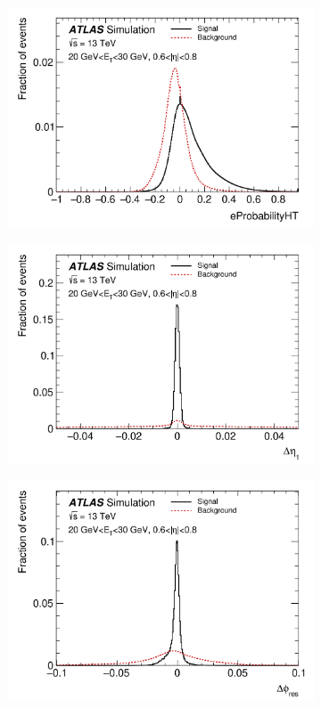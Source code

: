 \begin{figure}[hp]
\begin{subfigure}[b]{0.49\textwidth}
    \includegraphics[width=1.0\textwidth]{figs/egamma/eProbHT.png} 
    \label{fig:egamma:eProbHT}
  \end{subfigure}
  \hfill
  \begin{subfigure}[b]{0.49\textwidth}
    \centering
    \includegraphics[width=1.0\textwidth]{figs/egamma/deltaEta_1.png} 
    \label{fig:egamma:deltaEta_1}
  \end{subfigure}
  \hfill
  \begin{subfigure}[b]{0.49\textwidth}
    \centering
    \includegraphics[width=1.0\textwidth]{figs/egamma/deltaPhi_res.png} 

\end{subfigure}
\end{figure}
